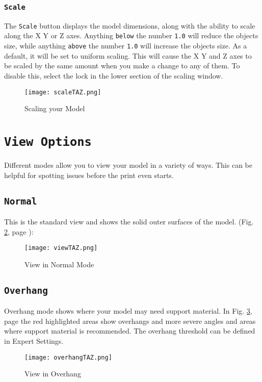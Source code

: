 \subsubsection{\texttt{Scale}}
The \texttt{Scale} button displays the model dimensions, along with the ability to scale along the X Y or Z axes. Anything \texttt{below} the number \texttt{1.0} will reduce the objects size, while anything \texttt{above} the number \texttt{1.0} will increase the objects size. As a default, it will be set to uniform scaling. This will cause the X Y and Z axes to be scaled by the same amount when you make a change to any of them. To disable this, select the lock in the lower section of the scaling window. 
\begin{figure}[H]
\centering
\texttt{[image: scaleTAZ.png]}
\caption{Scaling your Model}
\label{fig:Scaling your Model}
\end{figure}

\section{\texttt{View Options}}
Different modes allow you to view your model in a variety of ways. This can be helpful for spotting issues before the print even starts. 


\subsection{\texttt{Normal}}
This is the standard view and shows the solid outer surfaces of the model. (Fig. \ref{fig:Normal View}, page \pageref{fig:Normal View}): 

\begin{figure}[H]
\centering
\texttt{[image: viewTAZ.png]}
\caption{View in Normal Mode}
\label{fig:Normal View}
\end{figure}

\subsection{\texttt{Overhang}}
Overhang mode shows where your model may need support material. In Fig. \ref{fig:Overhang_View}, page \pageref{fig:Overhang_View} the red highlighted areas show overhangs and more severe angles and areas where support material is recommended. The overhang threshold can be defined in Expert Settings.
\begin{figure}[H]
\centering
\texttt{[image: overhangTAZ.png]}
\caption{View in Overhang}
\label{fig:Overhang_View}
\end{figure}

